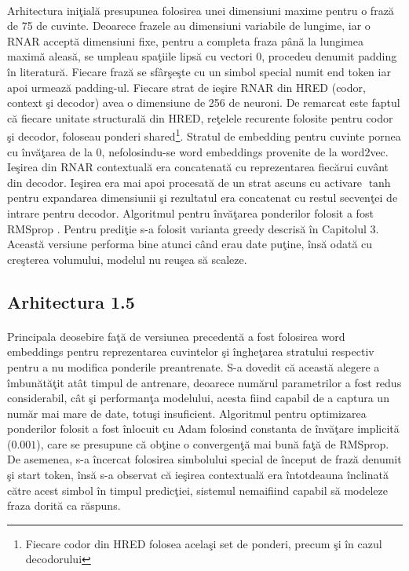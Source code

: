 \paragraph{}
Arhitectura ini\c tial\u a presupunea folosirea unei dimensiuni maxime pentru o fraz\u a de 75 de cuvinte. Deoarece frazele au dimensiuni variabile de lungime, iar o RNAR accept\u a dimensiuni fixe, pentru a completa fraza p\^ an\u a la lungimea maxim\u a aleas\u a, se umpleau spa\c tiile lips\u a cu vectori \(0\), procedeu denumit padding \^ in literatur\u a. Fiecare fraz\u a se sf\^ ar\c se\c ste cu un simbol special numit end token iar apoi urmeaz\u a padding-ul. Fiecare strat de ie\c sire RNAR din HRED (codor, context \c si decodor) avea o dimensiune de 256 de neuroni. De remarcat este faptul c\u a fiecare unitate structural\u a din HRED, re\c telele recurente folosite pentru codor \c si decodor, foloseau ponderi shared\footnote{Fiecare codor din HRED folosea acela\c si set de ponderi, precum \c si \^ in cazul decodorului}. Stratul de embedding pentru cuvinte pornea cu \^ inv\u a\c tarea de la 0, nefolosindu-se word embeddings provenite de la word2vec. Ie\c sirea din RNAR contextual\u a era concatenat\u a cu reprezentarea fiec\u arui cuv\^ ant din decodor. Ie\c sirea era mai apoi procesat\u a de un strat ascuns cu activare \(\tanh\) pentru expandarea dimensiunii \c si rezultatul era concatenat cu restul secven\c tei de intrare pentru decodor. Algoritmul pentru \^ inv\u a\c tarea ponderilor folosit a fost RMSprop \cite{rmsprop}. Pentru predi\c tie s-a folosit varianta greedy descris\u a \^ in Capitolul 3. Aceast\u a versiune performa bine atunci c\^ and erau date pu\c tine, \^ ins\u a odat\u a cu cre\c sterea volumului, modelul nu reu\c sea s\u a scaleze.

\subsection{Arhitectura 1.5}

\paragraph{}
Principala deosebire fa\c t\u a de versiunea precedent\u a a fost folosirea word embeddings pentru reprezentarea cuvintelor \c si \^ inghe\c tarea stratului respectiv pentru a nu modifica ponderile preantrenate. S-a dovedit c\u a aceast\u a alegere a \^ imbun\u at\u a\c tit at\^ at timpul de antrenare, deoarece num\u arul parametrilor a fost redus considerabil, c\^ at \c si performan\c ta modelului, acesta fiind capabil de a captura un num\u ar mai mare de date, totu\c si insuficient. Algoritmul pentru optimizarea ponderilor folosit a fost \^ inlocuit cu Adam \cite{DBLP:journals/corr/KingmaB14} folosind constanta de \^ inv\u a\c tare implicit\u a (\(0.001\)), care se presupune c\u a ob\c tine o convergen\c t\u a mai bun\u a fa\c t\u a de RMSprop. De asemenea, s-a \^ incercat folosirea simbolului special de \^ inceput de fraz\u a denumit \c si start token, \^ ins\u a s-a observat c\u a ie\c sirea contextual\u a era \^ intotdeauna \^ inclinat\u a c\u atre acest simbol \^ in timpul predic\c tiei, sistemul nemaifiind capabil s\u a modeleze fraza dorit\u a ca r\u aspuns.


